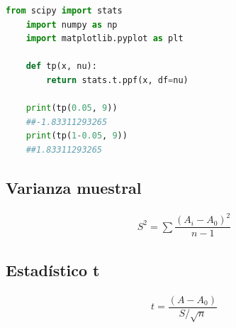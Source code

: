 \begin{lstlisting}[language=Python]
	from scipy import stats
	import numpy as np
	import matplotlib.pyplot as plt
	
	def tp(x, nu):
		return stats.t.ppf(x, df=nu)
	
	print(tp(0.05, 9))
	##-1.83311293265
	print(tp(1-0.05, 9))
	##1.83311293265
\end{lstlisting}

\subsection*{Varianza muestral}
\begin{align}
	S^{2}=\sum\dfrac{\left( A_{i}-A_{0} \right)^{2}}{n-1}
\end{align}


\subsection*{Estadístico t}
\begin{align}
	t = \dfrac{\left( A-A_{0} \right)}{S/\sqrt{n}}
\end{align}


